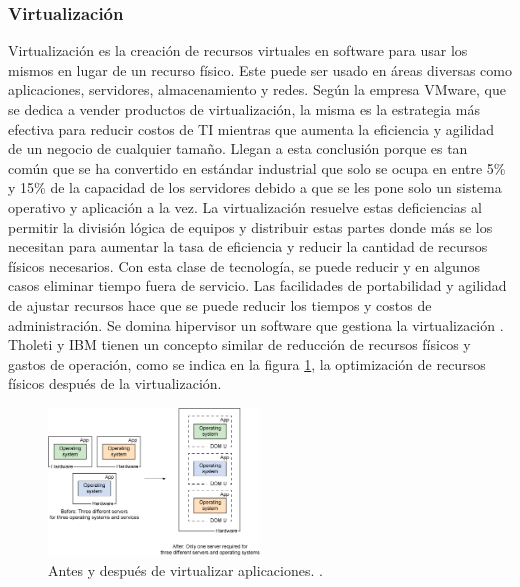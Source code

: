 \subsubsection{Virtualización}
Virtualización es la creación de recursos virtuales en software para usar los mismos en lugar de un recurso físico. Este puede ser usado en áreas diversas como aplicaciones, servidores, almacenamiento y redes. Según la empresa VMware, que se dedica a vender productos de virtualización, la misma es la estrategia más efectiva para reducir costos de TI mientras que aumenta la eficiencia y agilidad de un negocio de cualquier tamaño. Llegan a esta conclusión porque es tan común que se ha convertido en estándar industrial que solo se ocupa en entre 5\% y 15\% de la capacidad de los servidores debido a que se les pone solo un sistema operativo y aplicación a la vez. La virtualización resuelve estas deficiencias al permitir la división lógica de equipos y distribuir estas partes donde más se los necesitan para aumentar la tasa de eficiencia y reducir la cantidad de recursos físicos necesarios. Con esta clase de tecnología, se puede reducir y en algunos casos eliminar tiempo fuera de servicio. Las facilidades de portabilidad y agilidad de ajustar recursos hace que se puede reducir los tiempos y costos de administración. Se domina hipervisor un software que gestiona la virtualización \citep{VMWare-Virtualization}. Tholeti y IBM tienen un concepto similar de reducción de recursos físicos y gastos de operación, como se indica en la figura \ref{IBM-Virtualization}, la optimización de recursos físicos después de la virtualización.

\begin{figure}
  \begin{center}
      \includegraphics[width=0.5\textwidth]{Figures/ibm-virtualization.png}
  \end{center}
  \caption{Antes y después de virtualizar aplicaciones. \citep{IBM-Hypervisors}.}
  \label{IBM-Virtualization}
\end{figure}

